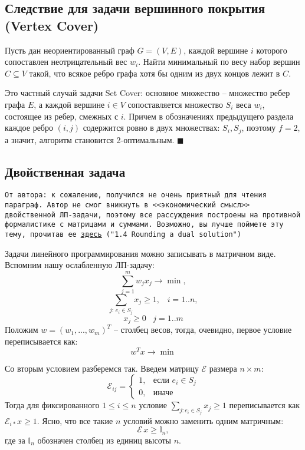 \subsection{Следствие для задачи вершинного покрытия (Vertex Cover)}
 {Пусть дан неориентированный граф $G = (V, E)$, каждой вершине $i$ которого сопоставлен неотрицательный вес $w_i$. Найти минимальный по весу набор вершин $C \subseteq V$ такой, что всякое ребро графа хотя бы одним из двух концов лежит в $C$.} 

 Это частный случай задачи Set Cover: основное множество -- множество ребер графа $E$, а каждой вершине $i \in V$ сопоставляется множество $S_i$ веса $w_i$, состоящее из ребер, смежных с $i$. Причем в обозначениях предыдущего раздела каждое ребро $(i, j)$ содержится ровно в двух множествах: $S_i, S_j$, поэтому $f = 2$, а значит, алгоритм становится 2-оптимальным. $\blacksquare$

\subsection{Двойственная задача}
\texttt{От автора: к сожалению, получился не очень приятный для чтения параграф. Автор не смог вникнуть в <<экономический смысл>> двойственной ЛП-задачи, поэтому все рассуждения построены на противной формалистике с матрицами и суммами. Возможно, вы лучше поймете эту тему, прочитав ее
\texttt{\href{https://www.designofapproxalgs.com/book.pdf}{\underline{здесь}}} 
("1.4 Rounding a dual solution")
}

Задачи линейного программирования можно записывать в матричном виде. Вспомним нашу ослабленную ЛП-задачу:
$$ \sum^m_{j=1} w_j x_j \rightarrow \min,$$
$$ \sum_{j:\, e_i \in S_j} x_j \geq 1, \;\;\; i=1..n,$$
$$ x_j \geq 0 \;\;\; j=1..m$$
Положим $w = (w_1, ..., w_m)^T$ -- столбец весов, тогда, очевидно, первое условие переписывается как: $$w^Tx \rightarrow \min$$

Со вторым условием разберемся так. Введем матрицу $\mathcal E$ размера $n \times m$:
$$
\mathcal{E}_{ij} = \begin{cases}
1, & \text{если } e_i \in S_j \\
0, & \text{иначе}
\end{cases}
$$
Тогда для фиксированного $1\leq i \leq n$ условие $\sum\limits_{j: e_i \in S_j} x_j \geq 1$ переписывается как $\mathcal{E}_{i*} x \geq 1$. Ясно, что все такие $n$ условий можно заменить одним матричным: $$\mathcal{E}\,x \geq \mathbb I_n,$$ где за $\mathbb I_n$ обозначен столбец из единиц высоты $n$. 


